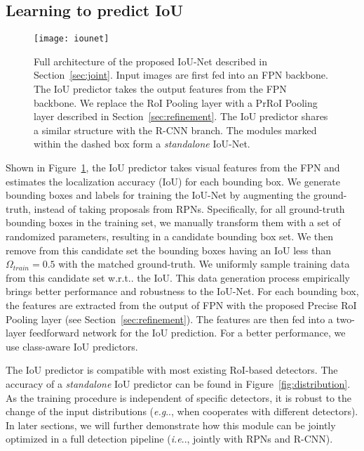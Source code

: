 \documentclass[runningheads]{llncs}
\makeatletter
\DeclareRobustCommand\onedot{\futurelet\@let@token\@onedot}
\def\@onedot{\ifx\@let@token.\else.\null\fi\xspace}
\def\eg{\emph{e.g}\onedot} \def\Eg{\emph{E.g}\onedot}
\def\ie{\emph{i.e}\onedot} \def\Ie{\emph{I.e}\onedot}
\def\wrt{w.r.t\onedot} \def\dof{d.o.f\onedot}
\makeatother
\begin{document}
\subsection{Learning to predict IoU}
\label{sec:predictiou}
\begin{figure}[!t]
    \centering
    \texttt{[image: iounet]}
    \caption{Full architecture of the proposed IoU-Net described in Section~\ref{sec:joint}. Input images are first fed into an FPN backbone. The IoU predictor takes the output features from the FPN backbone. We replace the RoI Pooling layer with a PrRoI Pooling layer described in Section~\ref{sec:refinement}. The IoU predictor shares a similar structure with the R-CNN branch. The modules marked within the dashed box form a \emph{standalone} IoU-Net.
}
    \label{fig:network}
\end{figure}

Shown in Figure~\ref{fig:network}, the IoU predictor takes visual features from the FPN and estimates the localization accuracy (IoU) for each bounding box.
We generate bounding boxes and labels for training the IoU-Net by augmenting the ground-truth, instead of taking proposals from RPNs. Specifically, for all ground-truth bounding boxes in the training set, we manually transform them with a set of randomized parameters, resulting in a candidate bounding box set. We then remove from this candidate set the bounding boxes having an IoU less than $\Omega_{train} = 0.5$ with the matched ground-truth. We uniformly sample training data from this candidate set \wrt the IoU. This data generation process empirically brings better performance and robustness to the IoU-Net. For each bounding box, the features are extracted from the output of FPN with the proposed Precise RoI Pooling layer (see Section~\ref{sec:refinement}). The features are then fed into a two-layer feedforward network for the IoU prediction. For a better performance, we use class-aware IoU predictors.

The IoU predictor is compatible with most existing RoI-based detectors. 
The accuracy of a \emph{standalone} IoU predictor can be found in Figure~\ref{fig:distribution}. As the training procedure is independent of specific detectors, it is robust to the change of the input distributions (\eg, when cooperates with different detectors).
In later sections, we will further demonstrate how this module can be jointly optimized in a full detection pipeline (\ie, jointly with RPNs and R-CNN).
\end{document}
